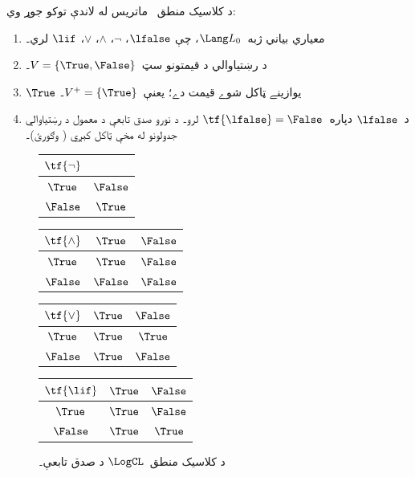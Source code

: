 \documentclass[../../../include/open-logic-section]{subfiles}
\begin{document}
\begin{ex}
د کلاسيک منطق~\LogCL{} ماتريس له لاندې توکو جوړ وي:
\begin{enumerate}
  \item معياري بياني ژبه~$\Lang L_0$، چې
  $\lfalse$، $\lnot$، $\land$، $\lor$، $\lif$ لري۔
  \item د رښتياوالي د قيمتونو سټ~$V = \{\True, \False\}$۔
  \item $\True$ يوازينے ټاکل شوے قيمت دے؛ يعنې~$V^+ = \{\True\}$۔
  \item د~$\lfalse$ دپاره~$\tf{\lfalse} = \False$ لرو۔ د نورو
  صدق تابعې د معمول د رښتياوالي جدولونو له مخې ټاکل کېږي
  ( وګورئ)۔
\end{enumerate}
\begin{figure}
  \begin{center}
      \begin{tabular}{c|c}
        $\tf{\lnot}$ & \\
        \hline
        $\True$ & $\False$ \\
        $\False$ & $\True$
      \end{tabular}
      \quad
      \begin{tabular}{c|cc}
        $\tf{\land}$ & $\True$ & $\False$ \\
        \hline
        $\True$ & $\True$ & $\False$ \\
        $\False$ & $\False$ & $\False$
      \end{tabular}
      \quad
      \begin{tabular}{c|cc}
        $\tf{\lor}$ & $\True$ & $\False$ \\
        \hline
        $\True$ & $\True$ & $\True$ \\
        $\False$ & $\True$ & $\False$
      \end{tabular}
      \quad
      \begin{tabular}{c|cc}
        $\tf{\lif}$ & $\True$ & $\False$ \\
        \hline
        $\True$ & $\True$ & $\False$ \\
        $\False$ & $\True$ & $\True$
      \end{tabular}
    \end{center}
    \caption{د کلاسيک منطق~$\LogCL$ د صدق تابعې۔}
  \end{figure}
  \end{ex}
\end{document}
